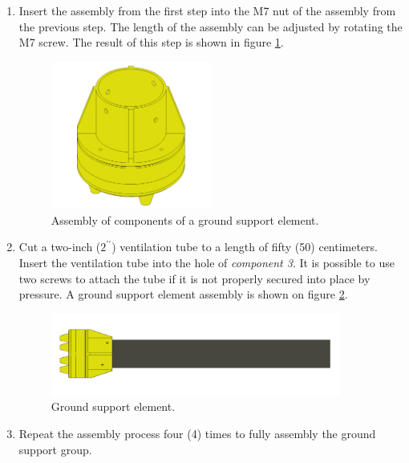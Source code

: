 \documentclass{article}
\begin{document}
\begin{enumerate}
    \item Insert the assembly from the first step into the M7 nut of the assembly from the previous step. The length of the assembly can be adjusted by rotating the M7 screw. The result of this step is shown in figure \ref{fig:gs_step_5}.
    
    \begin{figure}[H]
        \centering
        \includegraphics[width=0.5\textwidth]{images/ground/step_E.png}
        \caption{Assembly of components of a ground support element.}
        \label{fig:gs_step_5}
    \end{figure}
    
    \item Cut a two-inch ($2^{\prime \prime}$) ventilation tube to a length of fifty (50) centimeters. Insert the ventilation tube into the hole of \textit{component 3}. It is possible to use two screws to attach the tube if it is not properly secured into place by pressure. A ground support element assembly is shown on figure \ref{fig:gs_step_6}.
    
    \begin{figure}[H]
        \centering
        \includegraphics[width=0.9\textwidth]{images/ground/step_F.png}
        \caption{Ground support element.}
        \label{fig:gs_step_6}
    \end{figure}
    
    \item Repeat the assembly process four (4) times to fully assembly the ground support group.

\end{enumerate}
\end{document}
